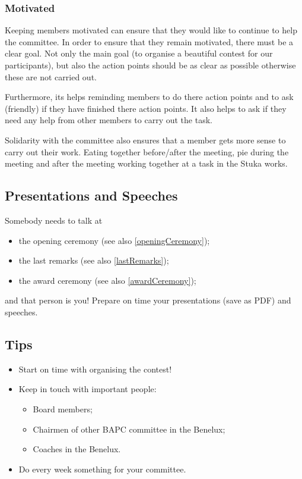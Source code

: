 	\subsubsection{Motivated}\label{motivated}
	Keeping members motivated can ensure that they would like to continue to help the committee. In order to ensure that they remain motivated, there must be a clear goal. Not only the main goal (to organise a beautiful contest for our participants), but also the action points should be as clear as possible otherwise these are not carried out.
	
	Furthermore, its helps reminding members to do there action points and to ask (friendly) if they have finished there action points. It also helps to ask if they need any help from other members to carry out the task.
	
	Solidarity with the committee also ensures that a member gets more sense to carry out their work. Eating together before/after the meeting, pie during the meeting and after the meeting working together at a task in the Stuka works.
	
	\subsection{Presentations and Speeches}
	Somebody needs to talk at
	\begin{itemize}
	\item the opening ceremony (see also \ref{openingCeremony});
	\item the last remarks (see also \ref{lastRemarks});
	\item the award ceremony (see also \ref{awardCeremony});
	\end{itemize}
	and that person is you! Prepare on time your presentations (save as PDF) and speeches.
	
	\subsection{Tips}
	\begin{itemize}
	\item Start on time with organising the contest!
	\item Keep in touch with important people:
		\begin{itemize}
		\item Board members;
		\item Chairmen of other BAPC committee in the Benelux;
		\item Coaches in the Benelux.
		\end{itemize}
	\item Do every week something for your committee.
	\end{itemize}
	
